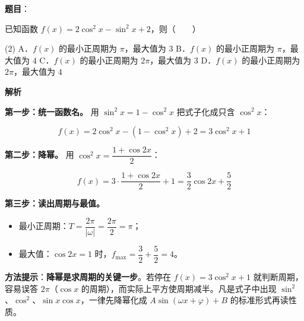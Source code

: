 \begin{answer}

\textbf{题目}：

已知函数 $f(x)=2\cos^{2}x-\sin^{2}x+2$，则\mbox{（　　）}

\begin{gkopts}(2)
\task A．$f(x)$ 的最小正周期为 $\pi$，最大值为 $3$
\task B．$f(x)$ 的最小正周期为 $\pi$，最大值为 $4$
\task C．$f(x)$ 的最小正周期为 $2\pi$，最大值为 $3$
\task D．$f(x)$ 的最小正周期为 $2\pi$，最大值为 $4$
\end{gkopts}

\textbf{解析}

\textbf{第一步：统一函数名。} 用 $\sin^{2}x=1-\cos^{2}x$ 把式子化成只含 $\cos^{2}x$：

\nopagebreak[4]
\[f(x)=2\cos^{2}x-\left(1-\cos^{2}x\right)+2=3\cos^{2}x+1\]

\textbf{第二步：降幂。} 用 $\cos^{2}x=\dfrac{1+\cos2x}2$：

\nopagebreak[4]
\[f(x)=3\cdot\frac{1+\cos2x}2+1=\frac32\cos2x+\frac52\]

\Needspace{0.25\textheight}

\textbf{第三步：读出周期与最值。}

\begin{itemize}
\item 最小正周期：$T=\dfrac{2\pi}{|\omega|}=\dfrac{2\pi}2=\pi$；
\item 最大值：$\cos2x=1$ 时，$f_{\max}=\dfrac32+\dfrac52=4$。
\end{itemize}

\begin{gktip}
\textbf{方法提示}：\textbf{降幂是求周期的关键一步}。若停在 $f(x)=3\cos^{2}x+1$ 就判断周期，容易误答 $2\pi$（$\cos x$ 的周期），而实际上平方使周期减半。凡是式子中出现 $\sin^{2}$、$\cos^{2}$、$\sin x\cos x$，一律先降幂化成 $A\sin(\omega x+\varphi)+B$ 的标准形式再读性质。
\end{gktip}


\par\medskip

\end{answer}
